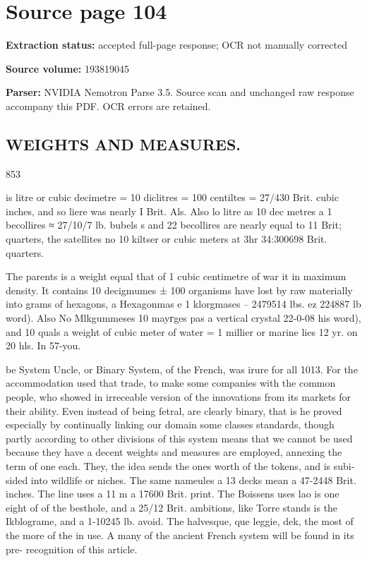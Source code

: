 \clearpage
\section{Source page 104}
\textbf{Extraction status:} accepted full-page response; OCR not manually corrected\par
\textbf{Source volume:} 193819045\par
\textbf{Parser:} NVIDIA Nemotron Parse 3.5. Source scan and unchanged raw response accompany this PDF. OCR errors are retained.\par\medskip
\subsection*{WEIGHTS AND MEASURES.}
853\par\medskip
is litre or cubic decimetre = 10 diclitres = 100 centiltes = 27/430 Brit. cubic inches, and so liere was nearly I Brit. Als. Also lo litre as 10 dec metres a 1 becollires ≈ 27/10/7 lb. bubels s and 22 becollires are nearly equal to 11 Brit; quarters, the satellites no 10 kiltser or cubic meters at 3hr 34:300698 Brit. quarters.\par\medskip
The parents is a weight equal that of 1 cubic centimetre of war it in maximum density. It contains 10 decigmumes ± 100 organisms have lost by raw materially into grams of hexagons, a Hexagonmas e 1 klorgmases – 2479514 lbs. ez 224887 lb word). Also No Mlkgummeses 10 mayгges pas a vertical crystal 22-0-08 his word), and 10 quals a weight of cubic meter of water = 1 millier or marine lies 12 yr. on 20 hls. In 57-you.\par\medskip
be System Uncle, or Binary System, of the French, was irure for all 1013. For the accommodation used that trade, to make some companies with the common people, who showed in irreceable version of the innovations from its markets for their ability. Even instead of being fetral, are clearly binary, that is he proved especially by continually linking our domain some classes standards, though partly according to other divisions of this system means that we cannot be used because they have a decent weights and measures are employed, annexing the term of one each. They, the idea sends the ones worth of the tokens, and is subi- sided into wildlife or niches. The same nameules a 13 decks mean a 47-2448 Brit. inches. The line uses a 11 m a 17600 Brit. print. The Boissens uses lao is one eight of of the besthole, and a 25/12 Brit. ambitions, like Torre stands is the Ikblograme, and a 1-10245 lb. avoid. The halvesque, que leggie, dek, the most of the more of the in use. A many of the ancient French system will be found in its pre- recognition of this article.\par\medskip
